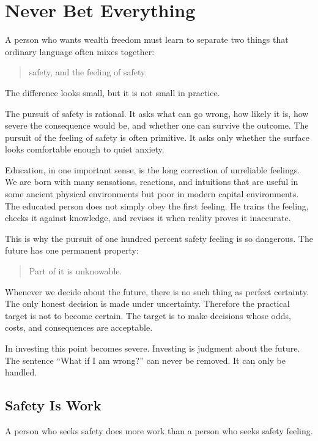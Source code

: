 \chapter{Never Bet Everything}

A person who wants wealth freedom must learn to separate two things that ordinary language often mixes together:

\begin{quote}
safety, and the feeling of safety.
\end{quote}

The difference looks small, but it is not small in practice.

The pursuit of safety is rational. It asks what can go wrong, how likely it is, how severe the consequence would be, and whether one can survive the outcome. The pursuit of the feeling of safety is often primitive. It asks only whether the surface looks comfortable enough to quiet anxiety.

Education, in one important sense, is the long correction of unreliable feelings. We are born with many sensations, reactions, and intuitions that are useful in some ancient physical environments but poor in modern capital environments. The educated person does not simply obey the first feeling. He trains the feeling, checks it against knowledge, and revises it when reality proves it inaccurate.

This is why the pursuit of one hundred percent safety feeling is so dangerous. The future has one permanent property:

\begin{quote}
Part of it is unknowable.
\end{quote}

Whenever we decide about the future, there is no such thing as perfect certainty. The only honest decision is made under uncertainty. Therefore the practical target is not to become certain. The target is to make decisions whose odds, costs, and consequences are acceptable.

In investing this point becomes severe. Investing is judgment about the future. The sentence ``What if I am wrong?'' can never be removed. It can only be handled.

\section*{Safety Is Work}

A person who seeks safety does more work than a person who seeks safety feeling.

